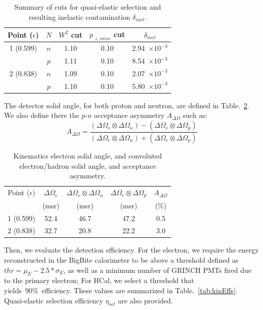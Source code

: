 \begin{table}[h]
\centering
\begin{tabular}{|c|c|c|c|c|}
\hline
Point ($\epsilon$) & $N$ & $W^2$ cut & $p_{\perp miss}$ cut & $\delta_{inel}$ \\
\hline
1 (0.599) & $n$ & 1.10 & 0.10 & 2.94~$\times 10^{-3}$ \\
 & $p$ & 1.11 & 0.10 & 8.54~$\times 10^{-3}$ \\
\hline
2 (0.838) & $n$ & 1.09 & 0.10 & 2.07~$\times 10^{-3}$ \\
 & $p$ & 1.10 & 0.10 & 5.80~$\times 10^{-3}$ \\
\hline
\end{tabular} 
\caption{Summary of cuts for quasi-elastic selection and resulting inelastic contamination $\delta_{inel}$.}
\label{tab:contam}
\end{table}

The detector solid angle, for both proton and neutron, are defined in Table.~\ref{tab:kinExpParams}.
We also define there the $p$-$n$ acceptance asymmetry $A_{\Delta\Omega}$ such as:
\begin{equation}
  A_{\Delta\Omega} = \frac{(\Delta\Omega_e \otimes \Delta\Omega_n)-(\Delta\Omega_e \otimes \Delta\Omega_p)}{(\Delta\Omega_e \otimes \Delta\Omega_n)+(\Delta\Omega_e \otimes \Delta\Omega_p)}
\end{equation}

\begin{table}[h]
\centering
\begin{tabular}{|c|c|c|c|c|}
\hline
Point ($\epsilon$) & $\Delta\Omega_e$ & $\Delta\Omega_e \otimes \Delta\Omega_n$ & $\Delta\Omega_e \otimes \Delta\Omega_p$ & $A_{\Delta\Omega}$ \\
 & (msr) & (msr) & (msr) & (\%) \\
\hline
1 (0.599) & 52.4 & 46.7 & 47.2 & 0.5 \\
\hline
2 (0.838) & 32.7 & 20.8 & 22.2 & 3.0 \\
\hline
\end{tabular} 
\caption{Kinematics electron solid angle, and convoluted electron/hadron solid angle, and acceptance asymmetry.}
\label{tab:kinExpParams}
\end{table}

Then, we evaluate the detection efficiency. For the electron, we require the energy reconstructed in the BigBite calorimeter to be above a threshold defined as $thr = \mu_E- 2.5* \sigma_E$, as well as a minimum number of GRINCH PMTs fired due to the primary electron; For HCal, we select a threshold that yields~90\%~efficiency. These values are summarized in Table.~\ref{tab:kinEffs}.
Quasi-elastic selection efficiency $\eta_{sel}$ are also provided.

